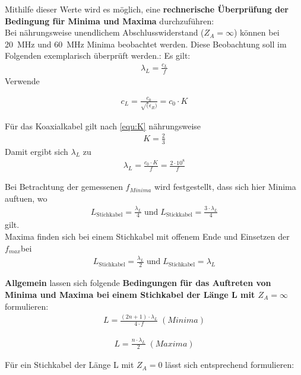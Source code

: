 \documentclass[a4paper,twoside,final]{article}
\begin{document}
 Mithilfe dieser Werte wird es möglich, eine \textbf{rechnerische Überprüfung der Bedingung für Minima und Maxima} durchzuführen:\\
 Bei nährungsweise unendlichem Abschlusswiderstand ($Z_A = \infty$) können bei
 \SI{20}{\mega\hertz} und \SI{60}{\mega\hertz} Minima beobachtet werden. Diese Beobachtung soll im Folgenden exemplarisch überprüft werden.:
 Es gilt:
 \begin{align}
   \lambda_{L}  = \frac{c_{L}}{f}
 \end{align}
 Verwende

 \begin{align}
   c_{L} = \frac{c_0}{\sqrt(\epsilon_R)} = c_0 \cdot K
 \end{align}

 Für das Koaxialkabel gilt nach \ref{equ:K} nährungsweise
 \begin{align}
   K = \frac{2}{3}
 \end{align}
 Damit ergibt sich $\lambda_{L}$ zu
 \begin{align}
 \lambda_{L} = \frac{c_0 \cdot K}{f} = \frac{2 \cdot 10^8}{f}
 \end{align}

 Bei Betrachtung der gemessenen $f_{Minima}$ wird festgestellt, dass sich hier Minima auftuen, wo
 \begin{align}
   L_{\text{Stichkabel}} = \frac{\lambda_{L}}{4} \; \text{und} \; L_{\text{Stickkabel}} = \frac{3\cdot \lambda_{L}}{4}
 \end{align}
 gilt. \\
 Maxima finden sich bei einem Stichkabel mit offenem Ende und Einsetzen der $f_{max}$bei
 \begin{align}
 L_{\text{Stichkabel}} = \frac{\lambda_{L}}{2} \; \text{und} \; L_{\text{Stichkabel}} = \lambda_{L}
 \end{align}

 \textbf{Allgemein} lassen sich folgende \textbf{Bedingungen für das Auftreten von Minima und Maxima bei einem Stichkabel der Länge L mit $Z_A = \infty$} formulieren:
 \begin{align}
 L = \frac{(2n+1)\cdot \lambda_{L}}{4\cdot f} \; (Minima)
 \end{align}

 \begin{align}
 L = \frac{n \cdot \lambda_{L}}{2} \; (Maxima)
 \end{align}

 Für ein Stichkabel der Länge L mit $Z_A = 0$ lässt sich entsprechend formulieren:
\end{document}
